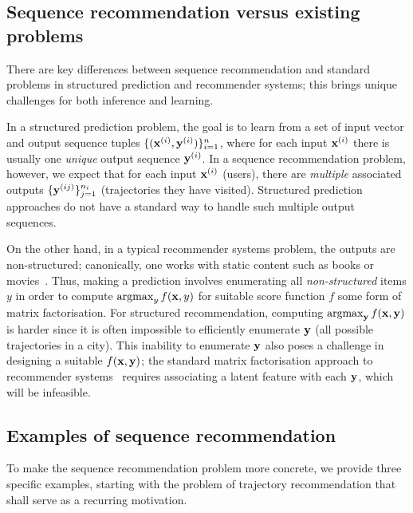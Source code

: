 %
\subsection{Sequence recommendation versus existing problems}

There are key differences between sequence recommendation and %
standard problems in structured prediction and recommender systems;
this brings unique challenges for both inference and learning.

In a structured prediction problem, the goal is to learn from a set of
input vector and output sequence tuples %
$\{ (\mathbf{x}^{({i})}, \mathbf{y}^{({i})}) \}_{i = 1}^n$, where
for each input $\mathbf{x}^{({i})}$ there is usually one \emph{unique} output sequence $\mathbf{y}^{({i})}$.
In a sequence recommendation problem, however, we expect that %
for each input $\mathbf{x}^{({i})}$ (\eg users),
there %
are \emph{multiple} associated outputs %
$\{ \mathbf{y}^{({ij})} \}_{j=1}^{n_i}$ (\eg trajectories they have visited).
Structured prediction approaches do not have a standard way to handle such multiple output sequences.

On the other hand, in a typical recommender systems problem, the outputs are non-structured; canonically, one works with {static} content such as books or movies~\citep{Goldberg:1992,Sarwar:2001,Netflix}.
Thus, making a prediction involves enumerating all {\em non-structured} items $y$ in order to compute $\operatorname*{argmax}_y f(\mathbf{x},y)$ for suitable score function $f$ \eg some form of matrix factorisation.
For structured recommendation, computing $\operatorname*{argmax}_{\mathbf{y}} f(\mathbf{x},\mathbf{y})$ is harder since it is often impossible to efficiently enumerate $\mathbf{y}$ (\eg all possible trajectories in a city).
This inability to enumerate $\mathbf{y}$ also poses a challenge in designing a suitable $f(\mathbf{x},\mathbf{y})$; \eg
the standard matrix factorisation approach to recommender systems~\citep{Koren:2009}
requires associating a latent feature with each $\mathbf{y}$, which will be infeasible.


%
\subsection{Examples of sequence recommendation}
\label{sec:trajrec}

To make the sequence recommendation problem more concrete,
we provide three specific examples,
starting with the problem of trajectory recommendation
that shall serve as a recurring motivation.


